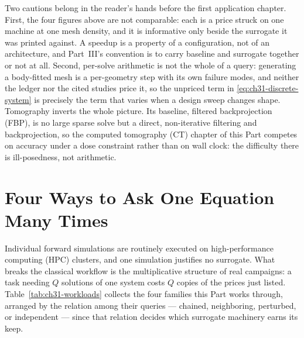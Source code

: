 Two cautions belong in the reader's hands before the first application chapter. First, the four
figures above are not comparable: each is a price struck on one machine at one mesh density, and
it is informative only beside the surrogate it was printed against. A
speedup is a property of a configuration, not of an architecture, and Part~III's convention is to
carry baseline and surrogate together or not at
all.
Second, per-solve arithmetic is not the whole of a query: generating a body-fitted mesh is a
per-geometry step with its own failure modes, and neither the ledger nor the cited studies price
it,
so the
unpriced term in \eqref{eq:ch31-discrete-system} is precisely the term that varies when a design
sweep changes shape. Tomography
inverts the whole picture. Its baseline, filtered backprojection (FBP), is no large sparse solve
but a direct, non-iterative filtering and backprojection, so the computed tomography (CT) chapter
of this Part competes on accuracy under a dose constraint rather than on wall clock: the
difficulty there is ill-posedness, not
arithmetic.

\section{Four Ways to Ask One Equation Many Times}
\label{sec:ch31-workloads}

Individual forward simulations are routinely executed on high-performance computing (HPC)
clusters, and one simulation justifies no surrogate. What breaks the classical workflow is the
multiplicative structure of real campaigns: a task needing $Q$ solutions of one system costs $Q$
copies of the prices just listed. Table~\ref{tab:ch31-workloads} collects the four families this
Part works through, arranged by the relation among their queries --- chained, neighboring,
perturbed, or independent --- since that relation decides which surrogate machinery earns its
keep.

